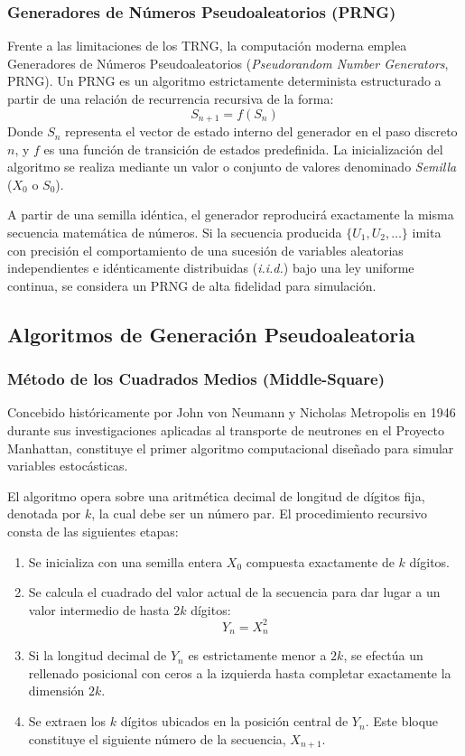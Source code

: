 \documentclass{article}
\begin{document}
\subsubsection{Generadores de Números Pseudoaleatorios (PRNG)}
Frente a las limitaciones de los TRNG, la computación moderna emplea Generadores de Números Pseudoaleatorios (\emph{Pseudorandom Number Generators}, PRNG). Un PRNG es un algoritmo estrictamente determinista estructurado a partir de una relación de recurrencia recursiva de la forma:
\begin{equation}
    S_{n+1} = f(S_n)
\end{equation}
Donde $S_n$ representa el vector de estado interno del generador en el paso discreto $n$, y $f$ es una función de transición de estados predefinida. La inicialización del algoritmo se realiza mediante un valor o conjunto de valores denominado \emph{Semilla} ($X_0$ o $S_0$).

A partir de una semilla idéntica, el generador reproducirá exactamente la misma secuencia matemática de números. Si la secuencia producida $\{U_1, U_2, \dots\}$ imita con precisión el comportamiento de una sucesión de variables aleatorias independientes e idénticamente distribuidas (\emph{i.i.d.}) bajo una ley uniforme continua, se considera un PRNG de alta fidelidad para simulación.

\newpage

\subsection{Algoritmos de Generación Pseudoaleatoria}

\subsubsection{Método de los Cuadrados Medios (Middle-Square)}
Concebido históricamente por John von Neumann y Nicholas Metropolis en 1946 durante sus investigaciones aplicadas al transporte de neutrones en el Proyecto Manhattan, constituye el primer algoritmo computacional diseñado para simular variables estocásticas.

El algoritmo opera sobre una aritmética decimal de longitud de dígitos fija, denotada por $k$, la cual debe ser un número par. El procedimiento recursivo consta de las siguientes etapas:
\begin{enumerate}
    \item Se inicializa con una semilla entera $X_0$ compuesta exactamente de $k$ dígitos.
    \item Se calcula el cuadrado del valor actual de la secuencia para dar lugar a un valor intermedio de hasta $2k$ dígitos:
    \begin{equation}
        Y_n = X_n^2
    \end{equation}
    \item Si la longitud decimal de $Y_n$ es estrictamente menor a $2k$, se efectúa un rellenado posicional con ceros a la izquierda hasta completar exactamente la dimensión $2k$.
    \item Se extraen los $k$ dígitos ubicados en la posición central de $Y_n$. Este bloque constituye el siguiente número de la secuencia, $X_{n+1}$.
\end{enumerate}
\end{document}
